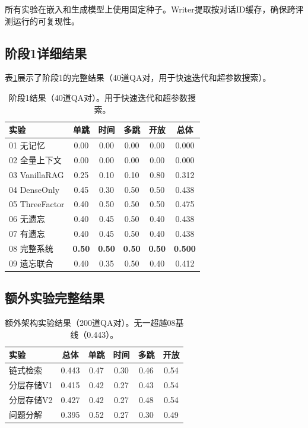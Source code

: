 \documentclass[11pt,a4paper]{ctexart}
\begin{document}
所有实验在嵌入和生成模型上使用固定种子。Writer提取按对话ID缓存，确保跨评测运行的可复现性。

\subsection{阶段1详细结果}

表\ref{tab:phase1}展示了阶段1的完整结果（40道QA对，用于快速迭代和超参数搜索）。

\begin{table}[H]
\centering
\begin{tabular}{@{}lccccc@{}}
\toprule
\textbf{实验} & \textbf{单跳} & \textbf{时间} & \textbf{多跳} & \textbf{开放} & \textbf{总体} \\
\midrule
01 无记忆 & 0.00 & 0.00 & 0.00 & 0.00 & 0.000 \\
02 全量上下文 & 0.00 & 0.00 & 0.00 & 0.00 & 0.000 \\
03 VanillaRAG & 0.25 & 0.10 & 0.10 & 0.80 & 0.312 \\
04 DenseOnly & 0.45 & 0.30 & 0.50 & 0.50 & 0.438 \\
05 ThreeFactor & 0.40 & 0.50 & 0.50 & 0.50 & 0.475 \\
06 无遗忘 & 0.40 & 0.45 & 0.50 & 0.40 & 0.438 \\
07 有遗忘 & 0.40 & 0.45 & 0.50 & 0.40 & 0.438 \\
08 完整系统 & \textbf{0.50} & \textbf{0.50} & \textbf{0.50} & \textbf{0.50} & \textbf{0.500} \\
09 遗忘联合 & 0.40 & 0.35 & 0.50 & 0.40 & 0.412 \\
\bottomrule
\end{tabular}
\caption{阶段1结果（40道QA对）。用于快速迭代和超参数搜索。}
\label{tab:phase1}
\end{table}

\subsection{额外实验完整结果}

\begin{table}[H]
\centering
\begin{tabular}{@{}lccccc@{}}
\toprule
\textbf{实验} & \textbf{总体} & \textbf{单跳} & \textbf{时间} & \textbf{多跳} & \textbf{开放} \\
\midrule
链式检索 & 0.443 & 0.47 & 0.30 & 0.46 & 0.54 \\
分层存储V1 & 0.415 & 0.42 & 0.27 & 0.43 & 0.54 \\
分层存储V2 & 0.427 & 0.42 & 0.27 & 0.48 & 0.54 \\
问题分解 & 0.395 & 0.52 & 0.27 & 0.30 & 0.49 \\
\bottomrule
\end{tabular}
\caption{额外架构实验结果（200道QA对）。无一超越08基线（0.443）。}
\label{tab:extra}
\end{table}
\end{document}
